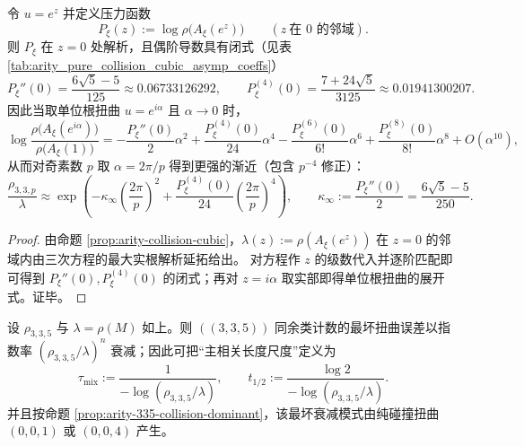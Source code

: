 \begin{proposition}\label{prop:arity-collision-quadratic-closed}
令 \(u=e^{z}\) 并定义压力函数
$$
P_\xi(z):=\log\rho\bigl(A_\xi(e^{z})\bigr)\qquad(z\ \text{在 }0\text{ 的邻域}).
$$
则 \(P_\xi\) 在 \(z=0\) 处解析，且偶阶导数具有闭式（见表 \ref{tab:arity_pure_collision_cubic_asymp_coeffs}）
$$
P_\xi''(0)=\frac{6\sqrt5-5}{125}\approx 0.06733126292,
\qquad
P_\xi^{(4)}(0)=\frac{7+24\sqrt5}{3125}\approx 0.01941300207.
$$
因此当取单位根扭曲 \(u=e^{i\alpha}\) 且 \(\alpha\to 0\) 时，
$$
\log\frac{\rho\bigl(A_\xi(e^{i\alpha})\bigr)}{\rho\bigl(A_\xi(1)\bigr)}
=-\frac{P_\xi''(0)}{2}\alpha^2+\frac{P_\xi^{(4)}(0)}{24}\alpha^4-\frac{P_\xi^{(6)}(0)}{6!}\alpha^6+\frac{P_\xi^{(8)}(0)}{8!}\alpha^8+O(\alpha^{10}),
$$
从而对奇素数 \(p\) 取 \(\alpha=2\pi/p\) 得到更强的渐近（包含 \(p^{-4}\) 修正）：
$$
\frac{\rho_{3,3,p}}{\lambda}
\approx
\exp\!\left(
-\kappa_\infty\left(\frac{2\pi}{p}\right)^2+\frac{P_\xi^{(4)}(0)}{24}\left(\frac{2\pi}{p}\right)^4
\right),
\qquad
\kappa_\infty:=\frac{P_\xi''(0)}{2}=\frac{6\sqrt5-5}{250}.
$$
\end{proposition}

\begin{proof}
由命题 \ref{prop:arity-collision-cubic}，\(\lambda(z):=\rho(A_\xi(e^z))\) 在 \(z=0\) 的邻域内由三次方程的最大实根解析延拓给出。
对方程作 \(z\) 的级数代入并逐阶匹配即可得到 \(P_\xi''(0),P_\xi^{(4)}(0)\) 的闭式；再对 \(z=i\alpha\) 取实部即得单位根扭曲的展开式。证毕。
\end{proof}

\begin{remark}\label{cor:arity-335-collision-mixing-scale}
设 \(\rho_{3,3,5}\) 与 \(\lambda=\rho(M)\) 如上。则 \(((3,3,5))\) 同余类计数的最坏扭曲误差以指数率
\(
(\rho_{3,3,5}/\lambda)^n
\)
衰减；因此可把“主相关长度尺度”定义为
$$
\tau_{\mathrm{mix}}:=\frac{1}{-\log(\rho_{3,3,5}/\lambda)},
\qquad
t_{1/2}:=\frac{\log 2}{-\log(\rho_{3,3,5}/\lambda)}.
$$
并且按命题 \ref{prop:arity-335-collision-dominant}，该最坏衰减模式由纯碰撞扭曲 $(0,0,1)$ 或 $(0,0,4)$ 产生。
\end{remark}

